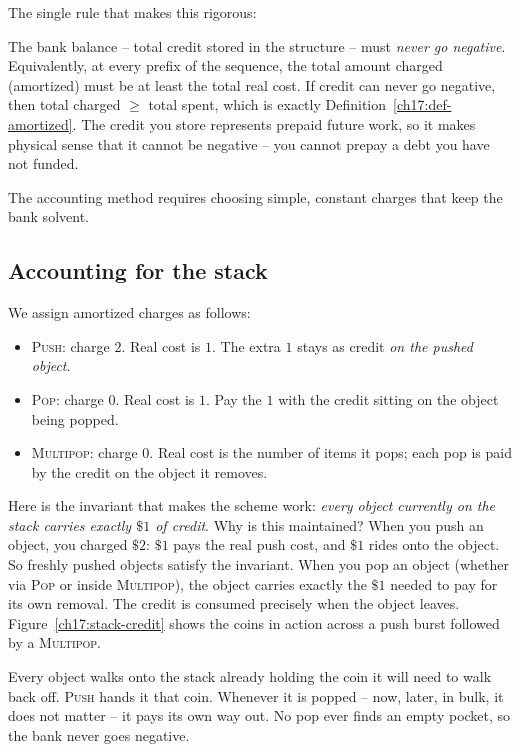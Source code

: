 The single rule that makes this rigorous:

\begin{focusbox}
The bank balance -- total credit stored in the structure -- must \emph{never go
negative}. Equivalently, at every prefix of the sequence, the total amount charged
(amortized) must be at least the total real cost. If credit can never go negative,
then total charged $\ge$ total spent, which is exactly
Definition~\ref{ch17:def-amortized}. The credit you store represents prepaid future
work, so it makes physical sense that it cannot be negative -- you cannot prepay a
debt you have not funded.
\end{focusbox}

The accounting method requires choosing simple, constant charges that keep the bank solvent.

\subsection{Accounting for the stack}

We assign amortized charges as follows:
\begin{itemize}
  \item \textsc{Push}: charge $2$. Real cost is $1$. The extra $1$ stays as credit
        \emph{on the pushed object}.
  \item \textsc{Pop}: charge $0$. Real cost is $1$. Pay the $1$ with the credit
        sitting on the object being popped.
  \item \textsc{Multipop}: charge $0$. Real cost is the number of items it pops;
        each pop is paid by the credit on the object it removes.
\end{itemize}

Here is the invariant that makes the scheme work: \emph{every object currently on the
stack carries exactly $\$1$ of credit}. Why is this maintained? When you push an
object, you charged $\$2$: $\$1$ pays the real push cost, and $\$1$ rides onto the
object. So freshly pushed objects satisfy the invariant. When you pop an object
(whether via \textsc{Pop} or inside \textsc{Multipop}), the object carries exactly
the $\$1$ needed to pay for its own removal. The credit is consumed precisely when
the object leaves. Figure~\ref{ch17:stack-credit} shows the coins in action across
a push burst followed by a \textsc{Multipop}.

\begin{intuitionbox}
Every object walks onto the stack already holding the coin it will need to walk
back off. \textsc{Push} hands it that coin. Whenever it is popped -- now, later, in
bulk, it does not matter -- it pays its own way out. No pop ever finds an empty
pocket, so the bank never goes negative.
\end{intuitionbox}

